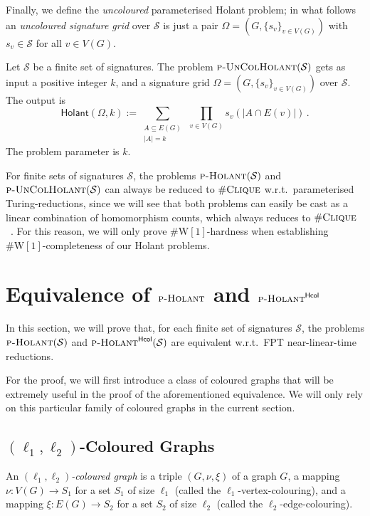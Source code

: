 \documentclass[authorcolumns,numberwithinsect]{no-lipics-v2022}
\newcommand{\W}{\mathrm{W}}
\newcommand{\holantprob}{\text{\sc{p-Holant}}}
\newcommand{\holantprobstar}{\text{\sc{p-Holant}}^{\mathsf{Hcol}}}
\newcommand{\holant}{\mathsf{Holant}}
\begin{document}
Finally, we define the \emph{uncoloured} parameterised Holant problem; in what follows an \emph{uncoloured signature grid} over $\mathcal{S}$ is just a pair $\Omega=(G,\{s_v\}_{v\in V(G)})$ with $s_v\in \mathcal{S}$ for all $v\in V(G)$.
\begin{definition}
    Let $\mathcal{S}$ be a finite set of signatures. The problem $\text{\sc{p-UnColHolant}}(\mathcal{S})$ gets as input a positive integer $k$, and a signature grid $\Omega=(G,\{s_v\}_{v\in V(G)})$ over $\mathcal{S}$. The output is
    \[ \holant(\Omega,k):= \sum_{\substack{A \subseteq E(G)\\|A|=k}}~\prod_{v\in V(G)} s_v(|A \cap E(v)|)\,. \]
    The problem parameter is $k$.
\end{definition}

\begin{remark}
    For finite sets of signatures $\mathcal{S}$, the problems $\textsc{p-Holant}(\mathcal{S})$ and $\textsc{p-UnColHolant}(\mathcal{S})$ can always be reduced to $\#\textsc{Clique}$ w.r.t.\ parameterised Turing-reductions, since we will see that both problems can easily be cast as a linear combination of homomorphism counts, which always reduces to $\#\textsc{Clique}$~\cite{DalmauJ04}. For this reason, we will only prove $\#\W[1]$-hardness when establishing $\#\W[1]$-completeness of our Holant problems.
\end{remark}

\section{Equivalence of $\holantprob$ and $\holantprobstar$}\label{sec:col_holants_equivalences}

In this section, we will prove that, for each finite set of signatures $\mathcal{S}$, the problems $\holantprob(\mathcal{S})$ and $\holantprobstar(\mathcal{S})$ are equivalent w.r.t.\ FPT near-linear-time reductions. 

For the proof, we will first introduce a class of coloured graphs that will be extremely useful in the proof of the aforementioned equivalence. We will only rely on this particular family of coloured graphs in the current section.

\subsection{$(\ell_1,\ell_2)$-Coloured Graphs}

An $(\ell_1,\ell_2)$\emph{-coloured graph} is a triple $(G,\nu,\xi)$ of a graph $G$, a mapping $\nu: V(G) \to S_1$ for a set $S_1$ of size $\ell_1$ (called the $\ell_1$-vertex-colouring), and a mapping $\xi: E(G) \to S_2$ for a set $S_2$ of size $\ell_2$ (called the $\ell_2$-edge-colouring). 
\end{document}
